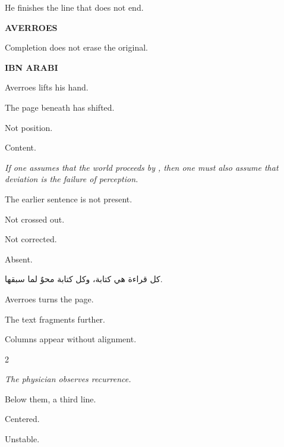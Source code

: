 He finishes the line that does not end.

\medskip

\textbf{AVERROES}

Completion does not erase the original.

\medskip

\textbf{IBN ARABI}


\medskip

Averroes lifts his hand.

The page beneath has shifted.

Not position.

Content.

\medskip

\textit{If one assumes that the world proceeds by , then one
must also assume that deviation is the failure of perception.}

\medskip

The earlier sentence is not present.

Not crossed out.

Not corrected.

Absent.

\medskip

\begin{AR}
كل قراءة هي كتابة، وكل كتابة محوٌ لما سبقها.
\end{AR}

\medskip

Averroes turns the page.

The text fragments further.

Columns appear without alignment.

\begin{multicols}{2}

\textit{The physician observes recurrence.}

\columnbreak


\end{multicols}

\medskip

Below them, a third line.

Centered.

Unstable.

\medskip

\begin{center}
\end{center}

